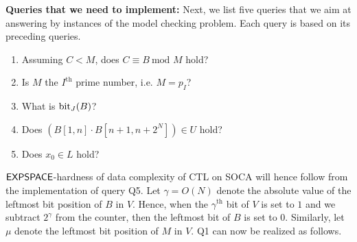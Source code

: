 \documentclass[times,envcountsame]{llncs}
\renewcommand{\mod}{\text{mod }}
\begin{document}
%
\renewcommand{\Re}{\Rightarrow}
\newcommand{\Li}{\Leftarrow}
\newcommand{\re}{\rightarrow}
\newcommand{\li}{\leftarrow}
%
\iffalse
Let us introduce some more notation for addressing
leftmost (starting to count from $0$) and rightmost bit
positions in each of the above sequences from $(*)$.
For each such sequence $\Theta$ let $\Theta_\Li$ denote
the {\em absolute position of the leftmost bit} of $\Theta$ in $V$
and let $\Theta_\re$ denote
the {\em position of the rightmost bit of $\Theta$ relative
to $\Theta_\Li$}, i.e. $\Theta_\re=|\Theta|-1$.
For example $C_\Li=\alpha+\beta$ and $J_\re=\alpha-1$.
\fi
%

\smallskip
\noindent
{\bf Queries that we need to implement: } Next, we list five queries that we aim
at answering by instances of the model checking problem.
Each query is based on its preceding queries.
\begin{enumerate}[(Q1)]
\item  Assuming $C<M$, does $C\equiv B\ \mod M$ hold?
\item  Is $M$ the $I^{\text{th}}$ prime number, i.e. $M=p_I$?
\item  What is $\text{bit}_J(B)$?
\item  Does $(B[1,n] \cdot B[n+1,n+2^N])\in U$ hold?
\item  Does $x_0\in L$ hold?
\end{enumerate}
\noindent
${\mathsf{EXPSPACE}}$-hardness of data complexity of CTL on SOCA will hence follow from the
implementation of query Q5.
Let $\gamma=O(N)$ denote the absolute
value of the leftmost bit position of $B$ in $V$.
Hence, when the $\gamma^{\text{th}}$ bit of $V$ is set to $1$ and we subtract
$2^\gamma$ from the counter, then the leftmost bit of $B$ is set to $0$.
Similarly, let $\mu$ denote the leftmost bit position of $M$ in $V$.
Q1 can now be realized as follows.
\end{document}
